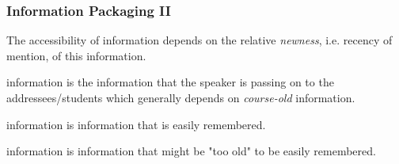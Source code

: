 \begin{frame}
  \frametitle{Information Packaging II}
  \begin{module}[id=infoPackaging2]

\noindent
 The accessibility of information depends on the relative \textit{newness}, i.e. recency of mention, of this information.\\

    \begin{definition}  {information} is the information that the speaker is passing on to the addressees/students which generally depends on \textit{course-old} information. \end{definition}
    \begin{definition}  {information} is information that is easily remembered. \end{definition}
    \begin{definition}  {information} is information that might be "too old" to be easily remembered. \end{definition}

  \end{module}
\end{frame}

